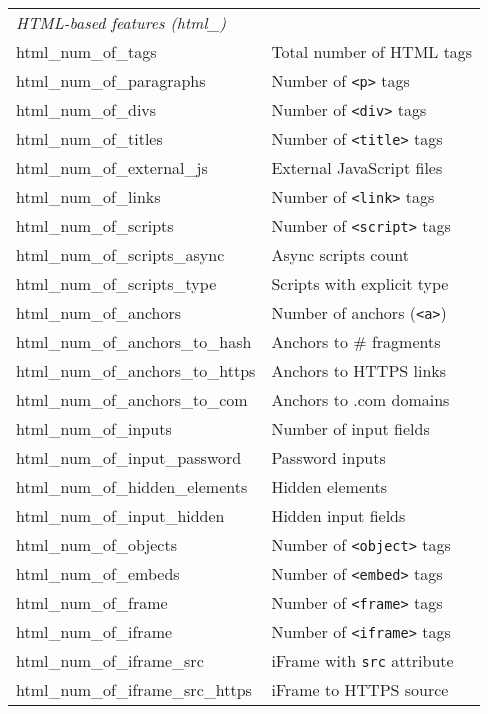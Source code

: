 \begin{longtable}{@{}ll@{}}
\midrule
\multicolumn{2}{l}{\emph{HTML-based features (html\_)}} \\
html\_num\_of\_tags & Total number of HTML tags \\
html\_num\_of\_paragraphs & Number of \texttt{<p>} tags \\
html\_num\_of\_divs & Number of \texttt{<div>} tags \\
html\_num\_of\_titles & Number of \texttt{<title>} tags \\
html\_num\_of\_external\_js & External JavaScript files \\
html\_num\_of\_links & Number of \texttt{<link>} tags \\
html\_num\_of\_scripts & Number of \texttt{<script>} tags \\
html\_num\_of\_scripts\_async & Async scripts count \\
html\_num\_of\_scripts\_type & Scripts with explicit type \\
html\_num\_of\_anchors & Number of anchors (\texttt{<a>}) \\
html\_num\_of\_anchors\_to\_hash & Anchors to \# fragments \\
html\_num\_of\_anchors\_to\_https & Anchors to HTTPS links \\
html\_num\_of\_anchors\_to\_com & Anchors to .com domains \\
html\_num\_of\_inputs & Number of input fields \\
html\_num\_of\_input\_password & Password inputs \\
html\_num\_of\_hidden\_elements & Hidden elements \\
html\_num\_of\_input\_hidden & Hidden input fields \\
html\_num\_of\_objects & Number of \texttt{<object>} tags \\
html\_num\_of\_embeds & Number of \texttt{<embed>} tags \\
html\_num\_of\_frame & Number of \texttt{<frame>} tags \\
html\_num\_of\_iframe & Number of \texttt{<iframe>} tags \\
html\_num\_of\_iframe\_src & iFrame with \texttt{src} attribute \\
html\_num\_of\_iframe\_src\_https & iFrame to HTTPS source \\


\end{longtable}

